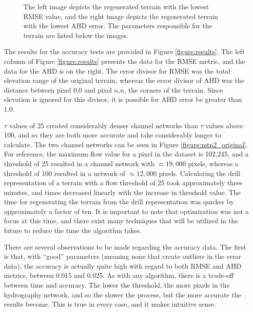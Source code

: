 \begin{figure}[t]
\begin{center}
\end{center}
\caption[Regenerated terrains with lowest errors]{\label{figure:lowest_errors} The left image depicts the regenerated terrain with the lowest RMSE value, and the right image depicts the regenerated terrain with the lowest AHD error. The parameters responsible for the terrain are listed below the images. }
\end{figure}


The results for the accuracy tests are provided in Figure \ref{figure:results}. The left column of Figure \ref{figure:results} presents the data for the RMSE metric, and the data for the AHD is on the right. The error divisor for RMSE was the total elevation range of the original terrain, whereas the error divisor of AHD was the distance between pixel 0,0 and pixel $n$,$n$, the corners of the terrain. Since elevation is ignored for this divisor, it is possible for AHD error be greater than 1.0. 

$\tau$ values of 25 created considerably denser channel networks than $\tau$ values above 100, and so they are both more accurate and take considerably longer to calculate. The two channel networks can be seen in Figure \ref{figure:mtn2_original}. For reference, the maximum flow value for a pixel in the dataset is 102,245, and a threshold of 25 resulted in a channel network with $\approx19,000$ pixels, whereas a threshold of 100 resulted in a network of $\approx12,000$ pixels. Calculating the drill representation of a terrain with a flow threshold of 25 took approximately three minutes, and times decreased linearly with the increase in threshold value. The time for regenerating the terrain from the drill representation was quicker by approximately a factor of ten. It is important to note that optimization was not a focus at this time, and there exist many techniques that will be utilized in the future to reduce the time the algorithm takes.

There are several observations to be made regarding the accuracy data. The first is that, with ``good'' parameters (meaning none that create outliers in the error data), the accuracy is actually quite high with regard to both RMSE and AHD metrics, between 0.015 and 0.025. As with any algorithm, there is a trade-off between time and accuracy. The lower the threshold, the more pixels in the hydrography network, and so the slower the process, but the more accurate the results become. This is true in every case, and it makes intuitive sense. 

